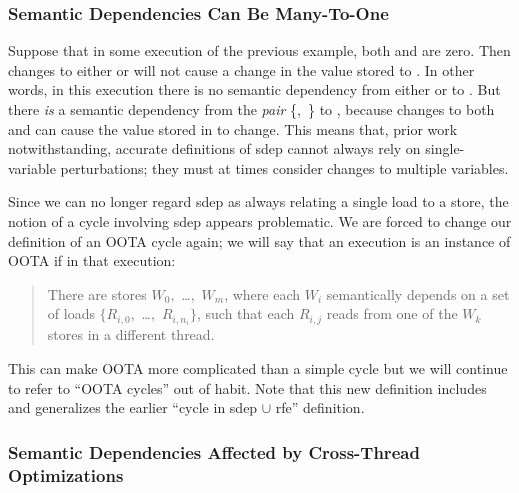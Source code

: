 \subsubsection{Semantic Dependencies Can Be Many-To-One}
\label{sec:Semantic Dependencies Can Be Many-To-One}

Suppose that in some execution of the previous example,
both  and  are zero.
Then changes to either  or 
will not cause a change in the value stored to .
In other words, in this execution there is no semantic dependency
from either  or  to .
But there \emph{is} a semantic dependency from the \emph{pair}
\{,~\} to ,
because changes to both  and 
can cause the value stored in  to change.
This means that, prior work~\cite{PaulEMcKenney2016OOTA}
notwithstanding, accurate definitions of sdep cannot always rely on
single-variable perturbations;
they must at times consider changes to multiple variables.

Since we can no longer regard sdep as always relating a single load to a store,
the notion of a cycle involving sdep appears problematic.
We are forced to change our definition of an OOTA cycle again;
we will say that an execution is an instance of OOTA if in that execution:
\begin{quote}
	There are stores $W_0,$ \ldots,~$W_m$,
	where each $W_i$ semantically depends on a set of loads
	$\{R_{i,0},$ \ldots,~$R_{i,n_i}\}$,
	such that each $R_{i,j}$ reads from one of the $W_k$
	stores in a different thread.
\end{quote}
This can make OOTA more complicated than a simple cycle but
we will continue to refer to ``OOTA cycles'' out of habit.
Note that this new definition includes and generalizes the earlier
``cycle in sdep $\cup$ rfe'' definition.

\subsubsection{Semantic Dependencies Affected by Cross-Thread Optimizations}
\label{sec:Semantic Dependencies Affected by Cross-Thread Optimizations}

